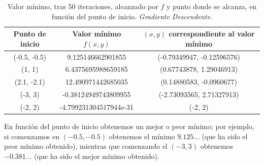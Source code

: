 \documentclass[11pt,a4paper]{article}
\theoremstyle{definition}
\begin{document}
\begin{itemize}
	\begin{table}[htbp]
	\begin{center}
	\begin{tabular}{|c|c|c|}
	\hline
	Punto de inicio & Valor mínimo $f(x,y)$ & $(x,y)$ correspondiente al valor mínimo \\
	\hline \hline
	(-0.5, -0.5) & 9.125146662901855 & (-0.79349947, -0.12596576)\\ \hline
	(1, 1) & 6.4375695988659185 & (0.67743878, 1.29046913)\\ \hline
	(2.1, -2.1) & 12.490971442685035 & (0.14880583, -0.0960677)\\  \hline
	(-3, 3) & -0.38124949743809955 & (-2.73093565, 2.71327913)\\ \hline
	(-2, 2) & -4.799231304517944e-31 & (-2, 2)\\ \hline
	\end{tabular}
	\caption{Valor mínimo, tras 50 iteraciones, alcanzado por $f$ y punto donde se alcanza, en función del punto de inicio. \textit{Gradiente Descendente}.}
	\label{tabla:sencilla}
	\end{center}
	\end{table}
	
	En función del punto de inicio obtenemos un mejor o peor mínimo; por ejemplo, si comenzamos en $(-0.5, -0.5)$ obtenemos el mínimo $9.125\ldots$ (que ha sido el peor mínimo obtenido), mientras que comenzando el $(-3,3)$ obtenemos $-0.381\ldots$ (que ha sido el mejor mínimo obtenido).
	

\end{itemize}
\end{document}
